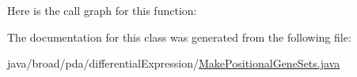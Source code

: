 Here is the call graph for this function\+:




The documentation for this class was generated from the following file\+:\begin{DoxyCompactItemize}
\item 
java/broad/pda/differential\+Expression/\hyperlink{_make_positional_gene_sets_8java}{Make\+Positional\+Gene\+Sets.\+java}\end{DoxyCompactItemize}
